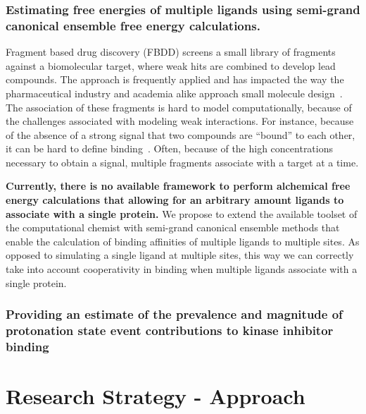 \documentclass[10pt,final]{article}
\newif\ifinstr
\newcommand{\instr}[1]{\ifdraft{\ifinstr {\color{cyan}\emph{#1}} \fi}{}}
\begin{document}

 


\subsubsection*{Estimating free energies of multiple ligands using semi-grand canonical ensemble free energy calculations.}
Fragment based drug discovery (FBDD) screens a small library of fragments against a biomolecular target, where weak hits are combined to develop lead compounds.
%
The approach is frequently applied and has impacted the way the pharmaceutical industry and academia alike approach small molecule design~\autocite{Hajduk2007a}.
%
The association of these fragments is hard to model computationally, because of the challenges associated with modeling weak interactions.
%
For instance, because of the absence of a strong signal that two compounds are ``bound'' to each other, it can be hard to define binding~\autocite{Gilson1997a}.
%
Often, because of the high concentrations necessary to obtain a signal, multiple fragments associate with a target at a time.

\textbf{Currently, there is no available framework to perform alchemical free energy calculations that allowing for an arbitrary amount ligands to associate with a single protein.}
%
We propose to extend the available toolset of the computational chemist with semi-grand canonical ensemble methods that enable the calculation of binding affinities of multiple ligands to multiple sites.
%
As opposed to simulating a single ligand at multiple sites, this way we can correctly take into account cooperativity in binding when multiple ligands associate with a single protein.

\subsubsection*{Providing an estimate of the prevalence and magnitude of protonation state event contributions to kinase inhibitor binding}


\section*{Research Strategy - Approach}
\instr{Approach: More specific background information. Describe in detail the experimental design and research methods to be used. Technical hurdles to be overcome should be mentioned. Alternative approaches should be given for experiments that may not be feasible. Discussion of expected or possible results and their interpretation. Best format for each specific aim: a) rationale, b) methods, c) expected results, d) alternatives. Theory aims should follow a similar structure where possible.}
\end{document}
